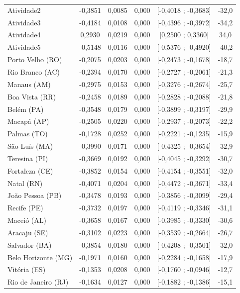 \documentclass[12pt,a4paper,header]{abnt}
\begin{document}
\begin{center}
\begin{longtable}{lccccc}
Atividade2 & -0,3851 & 0,0085 & 0,000 & [-0,4018 ; -0,3683] & -32,0 \\
Atividade3 & -0,4184 & 0,0108 & 0,000 & [-0,4396 ; -0,3972] & -34,2 \\
Atividade4 & 0,2930 & 0,0219 & 0,000 & [0,2500 ; 0,3360] & 34,0 \\
Atividade5 & -0,5148 & 0,0116 & 0,000 & [-0,5376 ; -0,4920] & -40,2 \\
Porto Velho (RO) & -0,2075 & 0,0203 & 0,000 & [-0,2473 ; -0,1678] & -18,7 \\
Rio Branco (AC) & -0,2394 & 0,0170 & 0,000 & [-0,2727 ; -0,2061] & -21,3 \\
Manaus (AM) & -0,2975 & 0,0153 & 0,000 & [-0,3276 ; -0,2674] & -25,7 \\
Boa Vista (RR) & -0,2458 & 0,0189 & 0,000 & [-0,2828 ; -0,2088] & -21,8 \\
Belém (PA) & -0,3548 & 0,0179 & 0,000 & [-0,3899 ; -0,3197] & -29,9 \\
Macapá (AP) & -0,2505 & 0,0220 & 0,000 & [-0,2937 ; -0,2073] & -22,2 \\
Palmas (TO) & -0,1728 & 0,0252 & 0,000 & [-0,2221 ; -0,1235] & -15,9 \\
São Luís (MA) & -0,3990 & 0,0171 & 0,000 & [-0,4325 ; -0,3654] & -32,9 \\
Teresina (PI) & -0,3669 & 0,0192 & 0,000 & [-0,4045 ; -0,3292] & -30,7 \\
Fortaleza (CE) & -0,3852 & 0,0154 & 0,000 & [-0,4154 ; -0,3551] & -32,0 \\
Natal (RN) & -0,4071 & 0,0204 & 0,000 & [-0,4472 ; -0,3671] & -33,4 \\
João Pessoa (PB) & -0,3478 & 0,0193 & 0,000 & [-0,3856 ; -0,3099] & -29,4 \\
Recife (PE) & -0,3732 & 0,0197 & 0,000 & [-0,4119 ; -0,3346] & -31,1 \\
Maceió (AL) & -0,3658 & 0,0167 & 0,000 & [-0,3985 ; -0,3330] & -30,6 \\
Aracaju (SE) & -0,3102 & 0,0223 & 0,000 & [-0,3539 ; -0,2664] & -26,7 \\
Salvador (BA) & -0,3854 & 0,0180 & 0,000 & [-0,4208 ; -0,3501] & -32,0 \\
Belo Horizonte (MG) & -0,1971 & 0,0160 & 0,000 & [-0,2284 ; -0,1658] & -17,9 \\
Vitória (ES) & -0,1353 & 0,0208 & 0,000 & [-0,1760 ; -0,0946] & -12,7 \\
Rio de Janeiro (RJ) & -0,1634 & 0,0127 & 0,000 & [-0,1882 ; -0,1386] & -15,1 \\

\end{longtable}
\end{center}
\end{document}
